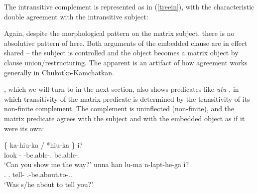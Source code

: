 \documentclass[output=paper]{langsci/langscibook}
\begin{document}
The intransitive complement is represented as in (\ref{treein}), with the
characteristic double agreement with the intransitive subject:

\ea \label{treein}
\z

Again, despite the morphological pattern on the matrix subject, there is no
absolutive pattern of  here. Both arguments of the embedded clause are
in effect shared -- the subject is controlled and the object becomes a matrix
object by clause union/restructuring. The apparent  is an
artifact of how agreement works generally in Chukotko-Kamchatkan.

, which we will turn to in the next section, also shows predicates like
 \emph{utu-}, in which transitivity of the matrix predicate is
determined by the transitivity of its non-finite complement. The complement is
uninflected (non-finite), and the matrix predicate agrees with the subject and
with the embedded object as if it were its own:

\ea \label{belhi} \begin{xlista}
    \ex {} \{ ka-hiu-ka / *hiu-ka \}   i?\\
    {} look \Caus-\Sbjv{} {} {} \Fsg{}-be.able-\Second.\Su{} {} \hphantom{*}be.able-\Second.\Su{} {} \glossQ{} \\
	\glt `Can you show me the way?'
	\ex \gll  unna han lu-ma n-lapt-he-ga i?\\
	\Tsg.\Erg{} \Ssg.\Abs{} tell-\Inf{} \Third.\Aa{}-be.about.to-\Pst.\Second.\Su{} \glossQ{} \\
	\glt `Was s/he about to tell you?'
	\end{xlista}
\z
\end{document}

